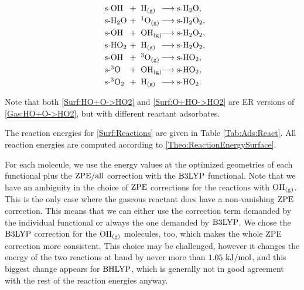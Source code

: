 \renewcommand\ronebox[1]{\makebox[1cm][l]{\enmat{#1}}}
\renewcommand\rtwobox[1]{\makebox[1.cm][l]{\ \enmat{#1}}}
\renewcommand\prodbox[1]{\makebox[1.65cm][l]{\enmat{#1}}}
\begin{subequations}
\begin{align}
   \label{Surf:HO+H->H2O}
   \ronebox{\sur\ho}+\rtwobox{\te{H}\gas}\prodbox{\chemar\sur\hto,} \\ 
   \label{Surf:H2O+O->H2O2}
   \ronebox{\sur\hto}+\rtwobox{\singo\gas}\prodbox{\chemar\sur\htot,} \\
   \label{Surf:HO+HO->H2O2}
   \ronebox{\sur\ho}+\rtwobox{\ho\gas}\prodbox{\chemar\sur\htot,} \\
   \label{Surf:HO2+H->H2O2}
   \ronebox{\sur\hot}+\rtwobox{\te{H}\gas}\prodbox{\chemar\sur\htot,} \\
   \label{Surf:HO+O->HO2}
   \ronebox{\sur\ho}+\rtwobox{\tripo\gas}\prodbox{\chemar\sur\hot,} \\
   \label{Surf:O+HO->HO2}
   \ronebox{\sur\tripo}+\rtwobox{\ho\gas}\prodbox{\chemar\sur\hot,} \\
   \label{Surf:3O2+H->HO2}
   \ronebox{\sur\tripot}+\rtwobox{\te{H}\gas}\prodbox{\chemar\sur\hot.}
\end{align}
\label{Surf:Reactions}
\end{subequations}

Note that both \eqref{Surf:HO+O->HO2} and \eqref{Surf:O+HO->HO2} are ER
versions of \eqref{Gas:HO+O->HO2}, but with different reactant adsorbates.

The reaction energies for \eqref{Surf:Reactions} are given in Table \ref{Tab:Ads:React}.
All reaction energies are computed according to \eqref{Theo:ReactionEnergySurface}.

For each molecule, we use the energy values at the optimized
geometries of each functional plus the $\text{ZPE}/\text{all}$ correction with the $\text{B3LYP}$ functional. Note that we have an ambiguity in the choice
of $\text{ZPE}$ corrections for the reactions with $\text O \text H_\text{(g)}$. This is the only
case where the gaseous reactant does have a non-vanishing $\text{ZPE}$ correction.
This means that we can either use the correction term demanded by the
individual functional or always the one demanded by $\text{B3LYP}$. We chose
the $\text{B3LYP}$ correction for the $\text O \text H_\text{(g)}$ molecules, too, which makes the whole
ZPE correction more consistent. This choice may be challenged, however it 
changes the energy of the two reactions at hand by never more than $1.05~\text {kJ/mol}$,
and this biggest change appears for $\text{BHLYP}$, which is generally not in good
agreement with the rest of the reaction energies anyway.

